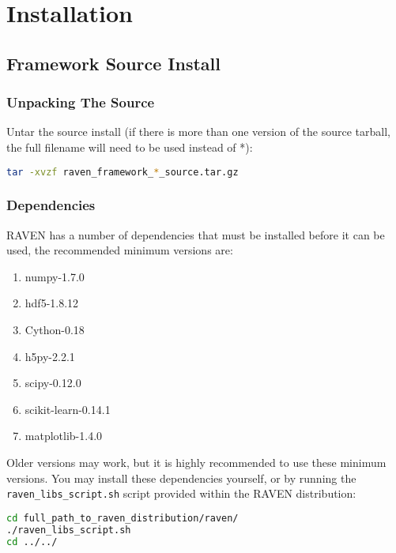 \section{Installation}

\subsection{Framework Source Install}

\subsubsection{Unpacking The Source}

Untar the source install (if there is more than one version of the
source tarball, the full filename will need to be used instead of *):

\begin{lstlisting}[language=bash]
tar -xvzf raven_framework_*_source.tar.gz
\end{lstlisting}

\subsubsection{Dependencies}
\label{raven_dependencies}
RAVEN has a number of dependencies that must be installed before it can be used,
the recommended minimum versions are:

\begin{enumerate}
\item numpy-1.7.0
\item hdf5-1.8.12
\item Cython-0.18
\item h5py-2.2.1
\item scipy-0.12.0
\item scikit-learn-0.14.1
\item matplotlib-1.4.0
\end{enumerate}

Older versions may work, but it is highly recommended to use these minimum 
versions.
%
You may install these dependencies yourself, or by running the
\texttt{raven\_libs\_script.sh} script provided within the RAVEN distribution:

\begin{lstlisting}[language=bash]
cd full_path_to_raven_distribution/raven/
./raven_libs_script.sh
cd ../../
\end{lstlisting}

